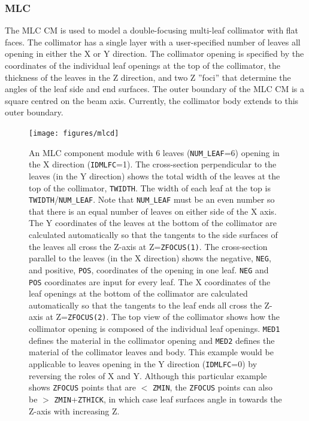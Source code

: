 \documentclass[12pt,twoside]{article}
\begin{document}
\subsubsection{MLC}
\renewcommand{\rightmark}{MLC CM}
The MLC CM is used to model a double-focusing multi-leaf collimator with
flat faces.
The collimator has a single layer with a user-specified number of leaves
all opening in either the X or Y direction.  The collimator opening is
specified by the coordinates of the individual leaf openings at the top of the
collimator, the thickness of the leaves in the Z direction, and two
Z ''foci'' that determine the angles of the leaf side and end
surfaces.
The outer boundary of the MLC CM is a square centred on
the beam axis.  Currently, the collimator body extends to this outer boundary.

\newpage
\begin{figure}[tp]
\begin{center}
\leavevmode
\begin{latexonly}
\texttt{[image: figures/mlcd]}
\end{latexonly}
\begin{htmlonly}
\texttt{[image: figures/mlcd]}}
\end{htmlonly}
\end{center}
\caption[MLC CM geometry]
{An MLC component module with 6 leaves ({\tt NUM\_LEAF}=6) opening in the X
direction ({\tt IDMLFC}=1).  The cross-section perpendicular to the leaves
(in the Y direction) shows the total width of the leaves at
the top of the collimator, {\tt TWIDTH}.  The width of each leaf at the top
is {\tt TWIDTH}/{\tt NUM\_LEAF}.  Note that {\tt NUM\_LEAF} must be
an even number so that there is an equal number of leaves on either side
of the X axis.  The Y coordinates of the leaves
at the bottom of the collimator are calculated automatically so that
the tangents to the
side surfaces of the leaves all cross the Z-axis at Z={\tt ZFOCUS(1)}.  The
cross-section parallel to the leaves (in the X direction) shows the negative,
{\tt NEG},
and positive, {\tt POS}, coordinates of the opening in one leaf.
{\tt NEG} and {\tt POS} coordinates are input for every leaf.
The X coordinates
of the leaf openings at the bottom of the collimator are calculated
automatically so that the tangents to the leaf ends all cross the Z-axis at
Z={\tt ZFOCUS(2)}.  The
top view of the collimator shows how the collimator opening is composed
of the individual leaf openings.  {\tt MED1} defines the material in the collimator
opening and {\tt MED2} defines the material of the collimator leaves and body.
This example would be applicable to leaves opening
in the Y direction ({\tt IDMLFC}=0) by reversing the roles of X and Y.  Although this
particular example shows {\tt ZFOCUS} points that are $<$ {\tt ZMIN}, the {\tt ZFOCUS}
points can also be $>$ {\tt ZMIN}+{\tt ZTHICK}, in which case leaf surfaces angle
in towards the Z-axis with increasing Z.}
\label{fig_MLCD}
\end{figure}
\end{document}
